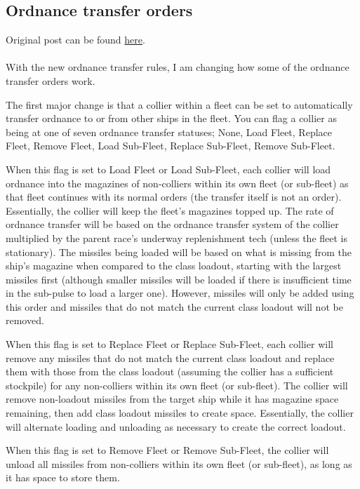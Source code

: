 \documentclass[../Aurora C# unofficial manual.tex]{subfiles}
\begin{document}
	
	\subsection{Ordnance transfer orders}
	Original post can be found
	\href{http://aurora2.pentarch.org/index.php?topic=8495.msg104196#msg104196}{here}.
	\\\\
	
	With the new ordnance transfer rules, I am changing how some of the ordnance transfer orders work.
	
	The first major change is that a collier within a fleet can be set to automatically transfer ordnance to or from other ships in the fleet. You can flag a collier as being at one of seven ordnance transfer statuses; None, Load Fleet, Replace Fleet, Remove Fleet, Load Sub-Fleet, Replace Sub-Fleet, Remove Sub-Fleet.
	
	When this flag is set to Load Fleet or Load Sub-Fleet, each collier will load ordnance into the magazines of non-colliers within its own fleet (or sub-fleet) as that fleet continues with its normal orders (the transfer itself is not an order). Essentially, the collier will keep the fleet's magazines topped up. The rate of ordnance transfer will be based on the ordnance transfer system of the collier multiplied by the parent race's underway replenishment tech (unless the fleet is stationary). The missiles being loaded will be based on what is missing from the ship's magazine when compared to the class loadout, starting with the largest missiles first (although smaller missiles will be loaded if there is insufficient time in the sub-pulse to load a larger one). However, missiles will only be added using this order and missiles that do not match the current class loadout will not be removed.
	
	When this flag is set to Replace Fleet or Replace Sub-Fleet, each collier will remove any missiles that do not match the current class loadout and replace them with those from the class loadout (assuming the collier has a sufficient stockpile) for any non-colliers within its own fleet (or sub-fleet). The collier will remove non-loadout missiles from the target ship while it has magazine space remaining, then add class loadout missiles to create space. Essentially, the collier will alternate loading and unloading as necessary to create the correct loadout.
	
	When this flag is set to Remove Fleet or Remove Sub-Fleet, the collier will unload all missiles from non-colliers within its own fleet (or sub-fleet), as long as it has space to store them.
	
\end{document}
